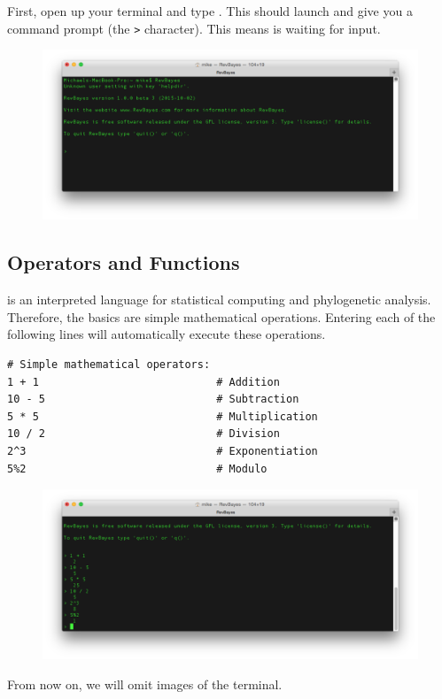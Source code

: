 First, open up your terminal and type \RevBayes.
This should launch \RevBayes and give you a command prompt (the \texttt{>} character).
This means \RevBayes is waiting for input.
\begin{figure}[H]
	\centering
	\includegraphics[width=\linewidth]{figures/terminal.pdf}
\end{figure}

\subsection{Operators and Functions}

\Rev is an interpreted language for statistical computing and phylogenetic analysis.
Therefore, the basics are simple mathematical operations.
Entering each of the following lines will automatically execute these operations.
{\tt \begin{snugshade*}
\begin{lstlisting}    
# Simple mathematical operators:
1 + 1                            # Addition
10 - 5                           # Subtraction
5 * 5                            # Multiplication
10 / 2                           # Division
2^3                              # Exponentiation
5%2                              # Modulo
\end{lstlisting}
\end{snugshade*}}

\begin{figure}[H]
	\centering
	\includegraphics[width=\linewidth]{figures/revbayes_operations.pdf}
\end{figure}
\noindent From now on, we will omit images of the terminal.

